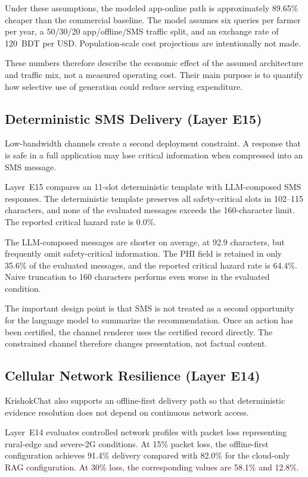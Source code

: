 \documentclass[a4paper,fleqn]{cas-dc}
\begin{document}
Under these assumptions, the modeled app-online path is approximately 89.65\% cheaper than the commercial baseline. The model assumes six queries per farmer per year, a 50/30/20 app/offline/SMS traffic split, and an exchange rate of 120~BDT per USD. Population-scale cost projections are intentionally not made.

These numbers therefore describe the economic effect of the assumed architecture and traffic mix, not a measured operating cost. Their main purpose is to quantify how selective use of generation could reduce serving expenditure.

\subsection{Deterministic SMS Delivery (Layer E15)}

Low-bandwidth channels create a second deployment constraint. A response that is safe in a full application may lose critical information when compressed into an SMS message.

Layer~E15 compares an 11-slot deterministic template with LLM-composed SMS responses. The deterministic template preserves all safety-critical slots in 102--115 characters, and none of the evaluated messages exceeds the 160-character limit. The reported critical hazard rate is 0.0\%.

The LLM-composed messages are shorter on average, at 92.9 characters, but frequently omit safety-critical information. The PHI field is retained in only 35.6\% of the evaluated messages, and the reported critical hazard rate is 64.4\%. Naive truncation to 160 characters performs even worse in the evaluated condition.

The important design point is that SMS is not treated as a second opportunity for the language model to summarize the recommendation. Once an action has been certified, the channel renderer uses the certified record directly. The constrained channel therefore changes presentation, not factual content.

\subsection{Cellular Network Resilience (Layer E14)}

KrishokChat also supports an offline-first delivery path so that deterministic evidence resolution does not depend on continuous network access.

Layer~E14 evaluates controlled network profiles with packet loss representing rural-edge and severe-2G conditions. At 15\% packet loss, the offline-first configuration achieves 91.4\% delivery compared with 82.0\% for the cloud-only RAG configuration. At 30\% loss, the corresponding values are 58.1\% and 12.8\%.
\end{document}

